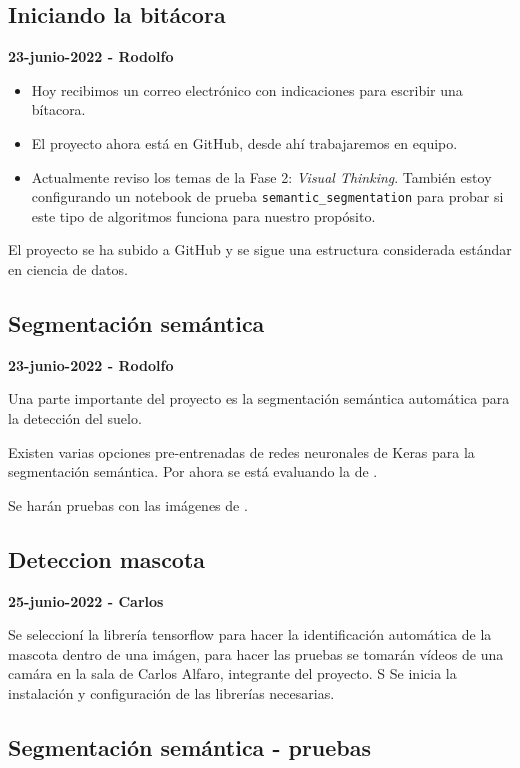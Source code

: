 \subsection*{Iniciando la bitácora}
\label{sec:bitacora}

\textbf{23-junio-2022 - Rodolfo}


\begin{itemize}
    \item Hoy recibimos un correo electrónico con indicaciones para escribir una bítacora.
    \item El proyecto ahora está en GitHub, desde ahí trabajaremos en equipo.
    \item Actualmente reviso los temas de la Fase 2: \textit{Visual Thinking}.
     También estoy configurando un notebook de prueba \texttt{semantic\_segmentation} para probar si este tipo de algoritmos funciona para nuestro propósito.
\end{itemize}


El proyecto se ha subido a GitHub y se sigue una estructura considerada estándar en ciencia de datos.

\subsection*{Segmentación semántica}

\textbf{23-junio-2022 - Rodolfo}

Una parte importante del proyecto es la segmentación semántica automática para la detección del suelo.

Existen varias opciones pre-entrenadas de redes neuronales de Keras para la segmentación semántica. Por ahora se está evaluando la de \textcite{gupta2022}.

Se harán pruebas con las imágenes de \textcite{unity2022}.

\subsection*{Deteccion mascota}

\textbf{25-junio-2022 - Carlos}

Se seleccioní la librería tensorflow para hacer la identificación automática de la mascota dentro de una imágen, para hacer las pruebas se tomarán vídeos de una camára en la sala de Carlos Alfaro, integrante del proyecto. S
Se inicia la instalación y configuración de las librerías necesarias.

\subsection*{Segmentación semántica - pruebas}

